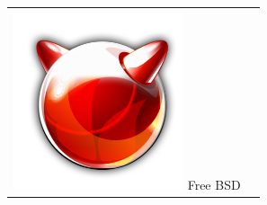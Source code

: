 \documentclass{beamer}
\begin{document}
\begin{frame}
\begin{tabular}{ll}
	\includegraphics[height=.25\textheight]{..//img/Bweb01-environnement/freebsd.png} 
	Free BSD &
	\\
	
\end{tabular}

\end{frame}
\end{document}
